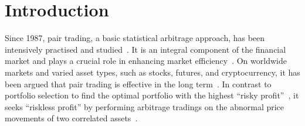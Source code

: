 \documentclass[sigconf]{acmart}
\begin{document}
	




\maketitle

\section{Introduction}
Since 1987, pair trading, a basic statistical arbitrage approach, has been intensively practised and studied~\cite{Lehoczky2018OverviewAH}.
It is an integral component of the financial market and plays a crucial role in enhancing market efficiency~\cite{Shearer2021StabilityEO}.
On worldwide markets and varied asset types, such as stocks, futures, and cryptocurrency, it has been argued that pair trading is effective in the long term~\cite{Krauss2017}.
In contrast to portfolio selection to find the optimal portfolio with the highest ``risky profit''~\cite{Hunanyan2019PortfolioS}, it seeks ``riskless profit'' by performing arbitrage tradings on the abnormal price movements of two correlated assets~\cite{Lehoczky2018OverviewAH}.
\end{document}
